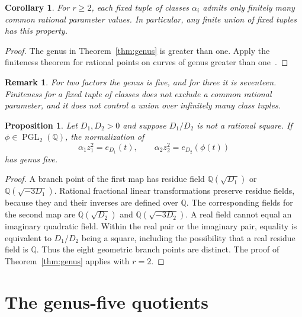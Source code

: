 \documentclass[11pt,a4paper]{article}
\newtheorem{proposition}[theorem]{Proposition}
\newtheorem{corollary}[theorem]{Corollary}
\newtheorem{remark}[theorem]{Remark}
\newcommand{\Q}{\mathbb Q}
\begin{document}
\begin{corollary}
For $r\geq2$, each fixed tuple of classes $\alpha_i$ admits only finitely
many common rational parameter values. In particular, any finite union
of fixed tuples has this property.
\end{corollary}
\begin{proof}
The genus in Theorem~\ref{thm:genus} is greater than one. Apply the
finiteness theorem for rational points on curves of genus greater than
one~\cite{Faltings}.
\end{proof}

\begin{remark}
For two factors the genus is five, and for three it is seventeen.
Finiteness for a fixed tuple of classes does not exclude a common
rational parameter, and it does not control a union over infinitely many
class tuples.
\end{remark}

\begin{proposition}\label{prop:mobius}
Let $D_1,D_2>0$ and suppose $D_1/D_2$ is not a rational square. If
$\phi\in\operatorname{PGL}_2(\Q)$, the normalization of
\[
 \alpha_1z_1^2=e_{D_1}(t),\qquad
 \alpha_2z_2^2=e_{D_2}(\phi(t))
\]
has genus five.
\end{proposition}
\begin{proof}
A branch point of the first map has residue field
$\Q(\sqrt{D_1})$ or $\Q(\sqrt{-3D_1})$. Rational fractional linear
transformations preserve residue fields, because they and their inverses
are defined over $\Q$. The corresponding fields for the second map are
$\Q(\sqrt{D_2})$ and $\Q(\sqrt{-3D_2})$.
A real field cannot equal an imaginary quadratic field. Within the real
pair or the imaginary pair, equality is equivalent to $D_1/D_2$ being a
square, including the possibility that a real residue field is $\Q$.
Thus the eight geometric branch points are distinct. The proof of
Theorem~\ref{thm:genus} applies with $r=2$.
\end{proof}

\section{The genus-five quotients}
\end{document}
